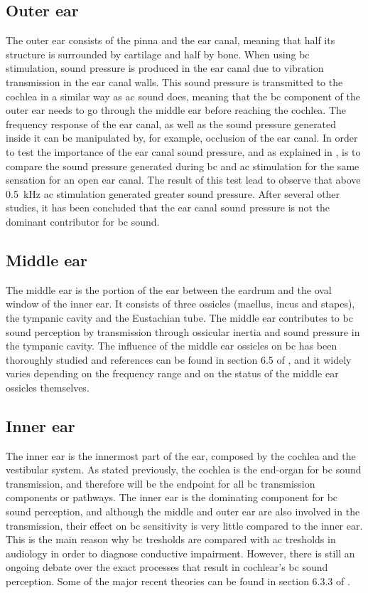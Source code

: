 \subsection*{Outer ear}

The outer ear consists of the pinna and the ear canal, meaning that half its structure is surrounded by cartilage and half by bone. When using \gls{bc} stimulation, sound pressure is produced in the ear canal due to vibration transmission in the ear canal walls. This sound pressure is transmitted to the cochlea in a similar way as \gls{ac} sound does, meaning that the \gls{bc} component of the outer ear needs to go through the middle ear before reaching the cochlea. The frequency response of the ear canal, as well as the sound pressure generated inside it can be manipulated by, for example, occlusion of the ear canal. In order to test the importance of the ear canal sound pressure, and as explained in \citep{puria_2013}, is to compare the sound pressure generated during \gls{bc} and \gls{ac} stimulation for the same sensation for an open ear canal. The result of this test lead to observe that above \SI{0.5}{\kilo\hertz} \gls{ac} stimulation generated greater sound pressure. After several other studies, it has been concluded that the ear canal sound pressure is not the dominant contributor for \gls{bc} sound.

\subsection*{Middle ear}

The middle ear is the portion of the ear between the eardrum and the oval window of the inner ear. It consists of three ossicles (maellus, incus and stapes), the tympanic cavity and the Eustachian tube. The middle ear contributes to \gls{bc} sound perception by transmission through ossicular inertia and sound pressure in the tympanic cavity. The influence of the middle ear ossicles on \gls{bc} has been thoroughly studied and references can be found in section 6.5 of \citep{puria_2013}, and it widely varies depending on the frequency range and on the status of the middle ear ossicles themselves.

\subsection*{Inner ear}

The inner ear is the innermost part of the ear, composed by the cochlea and the vestibular system. As stated previously, the cochlea is the end-organ for \gls{bc} sound transmission, and therefore will be the endpoint for all \gls{bc} transmission components or pathways. The inner ear is the dominating component for \gls{bc} sound perception, and although the middle and outer ear are also involved in the transmission, their effect on \gls{bc} sensitivity is very little compared to the inner ear. This is the main reason why \gls{bc} tresholds are compared with \gls{ac} tresholds in audiology in order to diagnose conductive impairment. However, there is still an ongoing debate over the exact processes that result in cochlear's \gls{bc} sound perception. Some of the major recent theories can be found in section 6.3.3 of \citep{puria_2013}.
